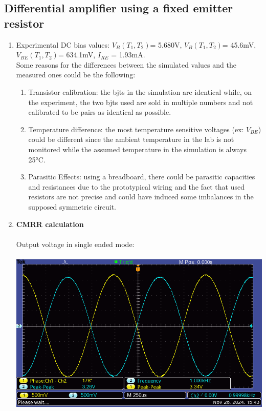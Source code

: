 \documentclass{article}
\begin{document}
	\subsection{Differential amplifier using a fixed emitter resistor}
		\begin{enumerate}
			\item 
			Experimental DC bias values: \(V_B(T_1,T_2)\)= 5.680V, \(V_B(T_1,T_2)\)= 45.6mV, \(V_{BE}(T_1,T_2)\)= 634.1mV, \(I_{RE}\) = 1.93mA.\\
			Some reasons for the differences between the simulated values and the measured ones could be the following:
			\begin{enumerate}
				\item Transistor calibration: the bjts in the simulation are identical while, on the experiment, the two bjts used are sold in multiple numbers and not calibrated to be pairs as identical as possible.
				\item Temperature difference: the most temperature sensitive voltages (ex: \(V_{BE}\)) could be different since the ambient temperature in the lab is not monitored while the assumed temperature in the simulation is always 25°C.
				\item Parasitic Effects: using a breadboard, there could be parasitic capacities and resistances due to the prototypical wiring and the fact that used resistors are not precise and could have induced some imbalances in the supposed symmetric circuit.  
			\end{enumerate}
		 	\pagebreak
			\item \textbf{CMRR calculation}\\\\
			Output voltage in single ended mode:\\\\
			\includegraphics[scale=0.5]{7.3.1.2 Collector Vs single/F0022TEK}\\\\

\end{enumerate}
\end{document}

